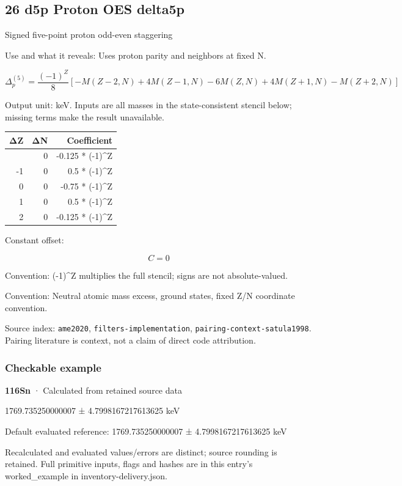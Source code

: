\documentclass[
  11pt,
  letterpaper,
]{article}
\begin{document}
\subsection{26 d5p Proton OES delta5p}\label{d5p-proton-oes-delta5p}

Signed five-point proton odd-even staggering

Use and what it reveals: Uses proton parity and neighbors at fixed N.

\[
\Delta_p^{(5)}=\frac{(-1)^Z}{8}[-M(Z-2,N)+4M(Z-1,N)-6M(Z,N)+4M(Z+1,N)-M(Z+2,N)]
\]

Output unit: keV. Inputs are all masses in the state-consistent stencil
below; missing terms make the result unavailable.

\begin{longtable}[]{@{}rrr@{}}
\toprule\noalign{}
ΔZ & ΔN & Coefficient \\
\midrule\noalign{}
\endhead
\bottomrule\noalign{}
\endlastfoot
-2 & 0 & -0.125 * (-1)\^{}Z \\
-1 & 0 & 0.5 * (-1)\^{}Z \\
0 & 0 & -0.75 * (-1)\^{}Z \\
1 & 0 & 0.5 * (-1)\^{}Z \\
2 & 0 & -0.125 * (-1)\^{}Z \\
\end{longtable}

Constant offset:

\[
C=0
\]

Convention: (-1)\^{}Z multiplies the full stencil; signs are not
absolute-valued.

Convention: Neutral atomic mass excess, ground states, fixed Z/N
coordinate convention.

Source index: \texttt{ame2020}, \texttt{filters-implementation},
\texttt{pairing-context-satula1998}. Pairing literature is context, not
a claim of direct code attribution.

\subsubsection{Checkable example}\label{checkable-example-25}

\textbf{116Sn} · Calculated from retained source data

1769.735250000007 ± 4.7998167217613625 keV

Default evaluated reference: 1769.735250000007 ± 4.7998167217613625 keV

Recalculated and evaluated values/errors are distinct; source rounding
is retained. Full primitive inputs, flags and hashes are in this entry's
worked\_example in inventory-delivery.json.
\end{document}
